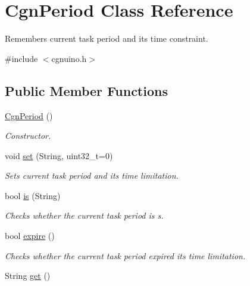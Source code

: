 \hypertarget{classCgnPeriod}{}\section{Cgn\+Period Class Reference}
\label{classCgnPeriod}


Remembers current task period and its time constraint.  




{\ttfamily \#include $<$cgnuino.\+h$>$}

\subsection*{Public Member Functions}
\begin{DoxyCompactItemize}
\item 
\hyperlink{classCgnPeriod_a403c5c1c8e3b3212ec29986b448c35c2}{Cgn\+Period} ()\hypertarget{classCgnPeriod_a403c5c1c8e3b3212ec29986b448c35c2}{}\label{classCgnPeriod_a403c5c1c8e3b3212ec29986b448c35c2}

\begin{DoxyCompactList}\small\item\em Constructor. \end{DoxyCompactList}\item 
void \hyperlink{classCgnPeriod_ae5d5882925c472e5a6e9f025a6b417f8}{set} (String, uint32\+\_\+t=0)
\begin{DoxyCompactList}\small\item\em Sets current task period and its time limitation. \end{DoxyCompactList}\item 
bool \hyperlink{classCgnPeriod_a314dc02f428d3a59c7f3dbae3d88a9d7}{is} (String)
\begin{DoxyCompactList}\small\item\em Checks whether the current task period is {\itshape s}. \end{DoxyCompactList}\item 
bool \hyperlink{classCgnPeriod_a0e98f94890d61e49bdcf6800389e81a2}{expire} ()\hypertarget{classCgnPeriod_a0e98f94890d61e49bdcf6800389e81a2}{}\label{classCgnPeriod_a0e98f94890d61e49bdcf6800389e81a2}

\begin{DoxyCompactList}\small\item\em Checks whether the current task period expired its time limitation. \end{DoxyCompactList}\item 
String \hyperlink{classCgnPeriod_a5bf2e4007d1049ad19d25214420d2013}{get} ()\hypertarget{classCgnPeriod_a5bf2e4007d1049ad19d25214420d2013}{}\label{classCgnPeriod_a5bf2e4007d1049ad19d25214420d2013}


\end{DoxyCompactItemize}
